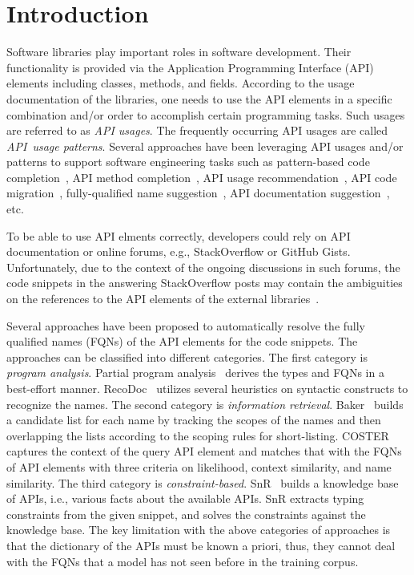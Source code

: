 \section{Introduction}
\label{sec:intro}

Software libraries play important roles in software development. Their
functionality is provided via the Application Programming Interface
(API) elements including classes, methods, and fields. According to
the usage documentation of the libraries, one needs to use the API
elements in a specific combination and/or order to accomplish certain
programming tasks. Such usages are referred to as {\em API
  usages}. The frequently occurring API usages are called~{\em
  API~usage patterns}. Several approaches have been leveraging API
usages and/or patterns to support software engineering tasks such as
pattern-based code completion~\cite{icse12}, API method
completion~\cite{fse16}, API usage recommendation~\cite{icsme18}, API
code migration~\cite{ase14}, fully-qualified name
suggestion~\cite{icse18}, API documentation
suggestion~\cite{liveapi14}, etc.

To be able to use API elments correctly, developers could rely on API
documentation or online forums, e.g., StackOverflow or GitHub
Gists. Unfortunately, due to the context of the ongoing discussions in
such forums, the code snippets in the answering StackOverflow posts
may contain the ambiguities on the references to the API elements of
the external libraries~\cite{liveapi14}.

Several approaches have been proposed to automatically resolve the
fully qualified names (FQNs) of the API elements for the code
snippets.  The approaches can be classified into different
categories. The first category is {\em program analysis}. Partial
program analysis~\cite{dagenais-oopsla08} derives the types and FQNs
in a best-effort manner. RecoDoc~\cite{dagenais-icse12} utilizes
several heuristics on syntactic constructs to recognize the names.
The second category is {\em information
  retrieval}. Baker~\cite{liveapi14} builds a candidate list for each
name by tracking the scopes of the names and then overlapping the
lists according to the scoping rules for short-listing.
COSTER~\cite{coster-ase19} captures the context of the query API
element and matches that with the FQNs of API elements with three
criteria on likelihood, context similarity, and name similarity.  The
third category is {\em constraint-based}. SnR~\cite{snr-icse22} builds
a knowledge base of APIs, i.e., various facts about the available
APIs. SnR extracts typing constraints from the given snippet, and
solves the constraints against the knowledge base. The key limitation
with the above categories of approaches is that the dictionary of the
APIs must be known a priori, thus, they cannot deal with the FQNs that
a model has not seen before in the training corpus.

